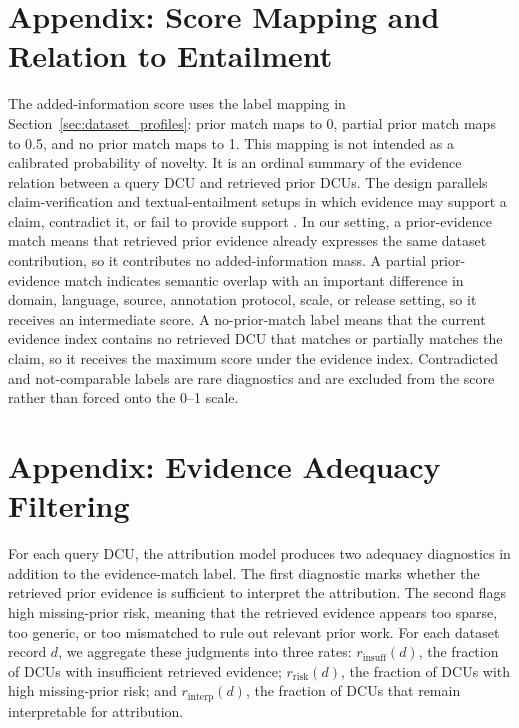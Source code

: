 \documentclass[11pt]{article}
\begin{document}
\section{Appendix: Score Mapping and Relation to Entailment}
\label{app:score_mapping}

The added-information score uses the label mapping in Section~\ref{sec:dataset_profiles}: prior match maps to 0, partial prior match maps to 0.5, and no prior match maps to 1.
This mapping is not intended as a calibrated probability of novelty.
It is an ordinal summary of the evidence relation between a query DCU and retrieved prior DCUs.
The design parallels claim-verification and textual-entailment setups in which evidence may support a claim, contradict it, or fail to provide support \citep{thorne2018fever}.
In our setting, a prior-evidence match means that retrieved prior evidence already expresses the same dataset contribution, so it contributes no added-information mass.
A partial prior-evidence match indicates semantic overlap with an important difference in domain, language, source, annotation protocol, scale, or release setting, so it receives an intermediate score.
A no-prior-match label means that the current evidence index contains no retrieved DCU that matches or partially matches the claim, so it receives the maximum score under the evidence index.
Contradicted and not-comparable labels are rare diagnostics and are excluded from the score rather than forced onto the 0--1 scale.
\section{Appendix: Evidence Adequacy Filtering}
\label{app:evidence_adequacy_details}

For each query DCU, the attribution model produces two adequacy diagnostics in addition to the evidence-match label.
The first diagnostic marks whether the retrieved prior evidence is sufficient to interpret the attribution.
The second flags high missing-prior risk, meaning that the retrieved evidence appears too sparse, too generic, or too mismatched to rule out relevant prior work.
For each dataset record $d$, we aggregate these judgments into three rates:
$r_{\mathrm{insuff}}(d)$, the fraction of DCUs with insufficient retrieved evidence;
$r_{\mathrm{risk}}(d)$, the fraction of DCUs with high missing-prior risk; and
$r_{\mathrm{interp}}(d)$, the fraction of DCUs that remain interpretable for attribution.
\end{document}
